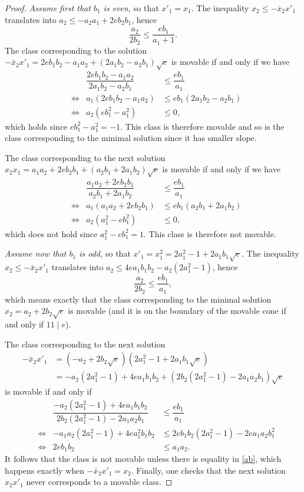 \begin{proof}
\emph{Assume first that $b_1$ is even,} so that $x'_1=x_1$. The inequality $x_2\le -\bar x_2x'_1 $ translates into $a_2\le -a_2a_1+2eb_2b_1$, hence
\begin{equation}\label{slope}
\frac{a_2}{2b_2}\le \frac{eb_1}{a_1+1}.
\end{equation}
The class corresponding to the solution $-\bar x_2x'_1=
2eb_1b_2 -a_1a_2 +(2a_1b_2-a_2b_1) \sqrt{e}$
is movable if and only if we have
\[
\begin{aligned}
&& \dfrac{2eb_1b_2-a_1a_2}{2a_1b_2-a_2b_1}&\le \dfrac{eb_1}{a_1}\\
&\iff& a_1(2eb_1b_2-a_1a_2)&\le eb_1(2a_1b_2-a_2b_1)\\
&\iff& a_2(eb_1^2-a_1^2)&\le 0,
\end{aligned}
\]
which holds since
$eb_1^2-a_1^2=-1$. This class is therefore movable and so is the class corresponding to the minimal solution since it has smaller slope.

The class corresponding to the next solution $x_2x_1=
a_1a_2+2eb_2b_1 +(a_2b_1+2a_1b_2) \sqrt{e}$ is movable if and only if we have
\[
\begin{aligned}
&& \dfrac{a_1a_2+2eb_2b_1}{a_2b_1+2a_1b_2}&\le \dfrac{eb_1}{a_1}\\
&\iff& a_1(a_1a_2+2eb_2b_1)&\le eb_1(a_2b_1+2a_1b_2)\\
&\iff& a_2(a_1^2-eb_1^2)&\le 0,
\end{aligned}
\]
which does not hold since $a_1^2-eb_1^2 =1$. This class is therefore not movable.

\emph{Assume now that $b_1$ is odd,} so that $x'_1=x_1^2=2a_1^2-1+2a_1b_1\sqrt{e}$. The inequality $x_2\le -\bar x_2x'_1 $ translates into $a_2\le 4ea_1b_1b_2-a_2(2a_1^2-1)$, hence
\begin{equation}\label{ab}
\frac{a_2}{2b_2}\le \dfrac{eb_1}{a_1},
\end{equation}
which means exactly that the class corresponding to the minimal solution $ x_2=a_2 +2b_2 \sqrt{e}$
is movable (and it is on the boundary of the movable cone if and only if $11\mid e$).

The class corresponding to the next solution
\begin{align*}
-\bar x_2x'_1&=
(-a_2 +2b_2 \sqrt{e})(2a_1^2-1+2a_1b_1\sqrt{e})
\\&
=-a_2(2a_1^2-1)+4ea_1b_1b_2+(2b_2(2a_1^2-1)-2a_1a_2b_1)\sqrt{e}
\end{align*}
is movable if and only if
\[
\begin{aligned}
&& \dfrac{-a_2(2a_1^2-1)+4ea_1b_1b_2}{2b_2(2a_1^2-1)-2a_1a_2b_1}&\le \dfrac{eb_1}{a_1}\\
&\iff& -a_1a_2(2a_1^2-1)+4ea_1^2b_1b_2&\le 2eb_1b_2(2a_1^2-1)-2ea_1a_2b_1^2\\
&\iff&2eb_1b_2 &\le a_1a_2.
\end{aligned}
\]
It follows that the class is not movable unless there is equality in \eqref{ab}, which happens exactly when
$-\bar x_2x'_1=x_2$. Finally, one checks that the next solution $ x_2x'_1$ never corresponds to a movable class.
\end{proof}

